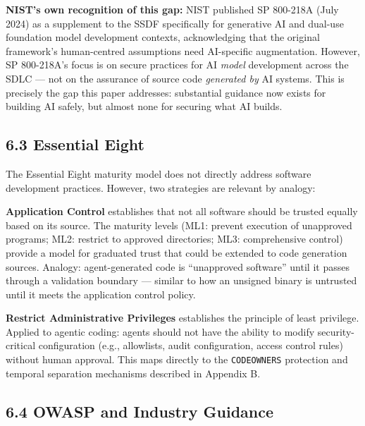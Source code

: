 \documentclass[a4paper,11pt]{report}
\begin{document}
\textbf{NIST's own recognition of this gap:} NIST published SP 800-218A
(July 2024) as a supplement to the SSDF specifically for generative AI
and dual-use foundation model development contexts, acknowledging that
the original framework's human-centred assumptions need AI-specific
augmentation. However, SP 800-218A's focus is on secure practices for AI
\emph{model} development across the SDLC --- not on the assurance of
source code \emph{generated by} AI systems. This is precisely the gap
this paper addresses: substantial guidance now exists for building AI
safely, but almost none for securing what AI builds.

\hypertarget{essential-eight}{%
\subsection{6.3 Essential Eight}\label{essential-eight}}

The Essential Eight maturity model does not directly address software
development practices. However, two strategies are relevant by analogy:

\textbf{Application Control} establishes that not all software should be
trusted equally based on its source. The maturity levels (ML1: prevent
execution of unapproved programs; ML2: restrict to approved directories;
ML3: comprehensive control) provide a model for graduated trust that
could be extended to code generation sources. Analogy: agent-generated
code is ``unapproved software'' until it passes through a validation
boundary --- similar to how an unsigned binary is untrusted until it
meets the application control policy.

\textbf{Restrict Administrative Privileges} establishes the principle of
least privilege. Applied to agentic coding: agents should not have the
ability to modify security-critical configuration (e.g., allowlists,
audit configuration, access control rules) without human approval. This
maps directly to the \texttt{CODEOWNERS} protection and temporal
separation mechanisms described in Appendix B.

\hypertarget{owasp-and-industry-guidance}{%
\subsection{6.4 OWASP and Industry
Guidance}\label{owasp-and-industry-guidance}}
\end{document}
